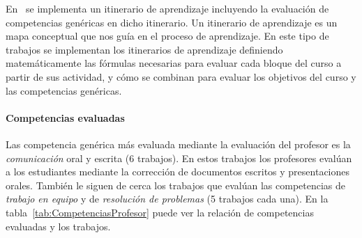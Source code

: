 En~\cite{yang2014fine} se implementa un itinerario de aprendizaje incluyendo la evaluación de competencias genéricas en dicho itinerario. Un itinerario de aprendizaje es un mapa conceptual que nos guía en el proceso de aprendizaje. En este tipo de trabajos se implementan los itinerarios de aprendizaje definiendo matemáticamente las fórmulas necesarias para evaluar cada bloque del curso a partir de sus actividad, y cómo se combinan para evaluar los objetivos del curso y las competencias genéricas.

\paragraph*{Competencias evaluadas}
Las competencia genérica más evaluada mediante la evaluación del profesor es la \emph{comunicación} oral y escrita (6 trabajos). En estos trabajos los profesores evalúan a los estudiantes mediante la corrección de documentos escritos y presentaciones orales. También le siguen de cerca los trabajos que evalúan las competencias de \emph{trabajo en equipo} y de \emph{resolución de problemas} (5 trabajos cada una). En la tabla~\ref{tab:CompetenciasProfesor} puede ver la relación de competencias evaluadas y los trabajos.

